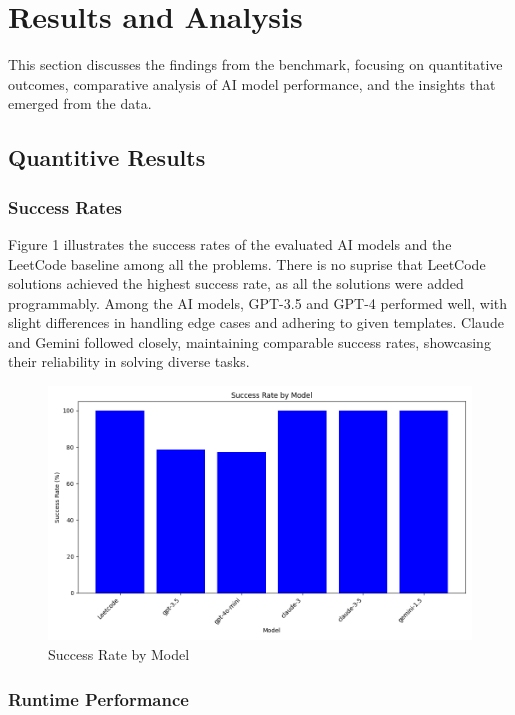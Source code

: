 
\section{Results and Analysis}

This section discusses the findings from the benchmark, focusing on quantitative outcomes, comparative analysis of AI model performance, and the insights that emerged from the data.

\subsection{Quantitive Results}

\subsubsection{Success Rates}

Figure 1 illustrates the success rates of the evaluated AI models and the LeetCode baseline among all the problems. There is no suprise that LeetCode solutions achieved the highest success rate, as all the solutions were added programmably. Among the AI models, GPT-3.5 and GPT-4 performed well, with slight differences in handling edge cases and adhering to given templates. Claude and Gemini followed closely, maintaining comparable success rates, showcasing their reliability in solving diverse tasks.

\begin{figure}[H]
    \centering
    \includegraphics[width=15cm]{attachments/Success_Rate.png}
    \caption{Success Rate by Model} 
\end{figure}



\subsubsection{Runtime Performance}

